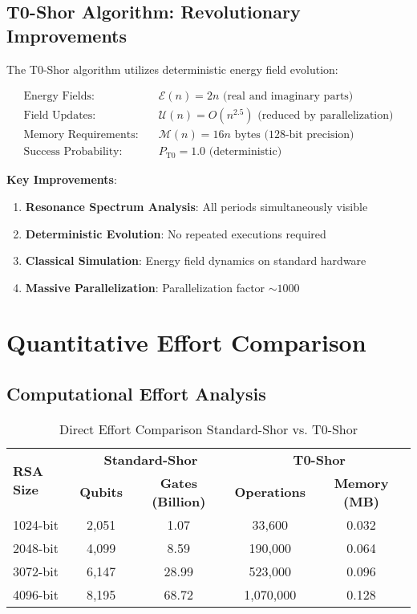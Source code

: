\documentclass[12pt,a4paper]{article}
\begin{document}
	\subsection{T0-Shor Algorithm: Revolutionary Improvements}
	
	The T0-Shor algorithm utilizes deterministic energy field evolution:
	
	\begin{align}
		\text{Energy Fields}: \quad &\mathcal{E}(n) = 2n \text{ (real and imaginary parts)} \\
		\text{Field Updates}: \quad &\mathcal{U}(n) = O(n^{2.5}) \text{ (reduced by parallelization)} \\
		\text{Memory Requirements}: \quad &\mathcal{M}(n) = 16n \text{ bytes (128-bit precision)} \\
		\text{Success Probability}: \quad &P_{\text{T0}} = 1.0 \text{ (deterministic)}
	\end{align}
	
	\textbf{Key Improvements}:
	\begin{enumerate}
		\item \textbf{Resonance Spectrum Analysis}: All periods simultaneously visible
		\item \textbf{Deterministic Evolution}: No repeated executions required
		\item \textbf{Classical Simulation}: Energy field dynamics on standard hardware
		\item \textbf{Massive Parallelization}: Parallelization factor $\sim 1000$
	\end{enumerate}
	
	\section{Quantitative Effort Comparison}
	
	\subsection{Computational Effort Analysis}
	
	\begin{table}[htbp]
		\centering
		\begin{tabular}{lcccc}
			\toprule
			\multirow{2}{*}{\textbf{RSA Size}} & \multicolumn{2}{c}{\textbf{Standard-Shor}} & \multicolumn{2}{c}{\textbf{T0-Shor}} \\
			\cmidrule(lr){2-3} \cmidrule(lr){4-5}
			& \textbf{Qubits} & \textbf{Gates (Billion)} & \textbf{Operations} & \textbf{Memory (MB)} \\
			\midrule
			\rowcolor{red!20} 1024-bit & 2,051 & 1.07 & 33,600 & 0.032 \\
			\rowcolor{orange!20} 2048-bit & 4,099 & 8.59 & 190,000 & 0.064 \\
			\rowcolor{yellow!20} 3072-bit & 6,147 & 28.99 & 523,000 & 0.096 \\
			\rowcolor{green!20} 4096-bit & 8,195 & 68.72 & 1,070,000 & 0.128 \\
			\bottomrule
		\end{tabular}
		\caption{Direct Effort Comparison Standard-Shor vs. T0-Shor}
		\label{tab:effort_comparison}
	\end{table}
	
\end{document}

